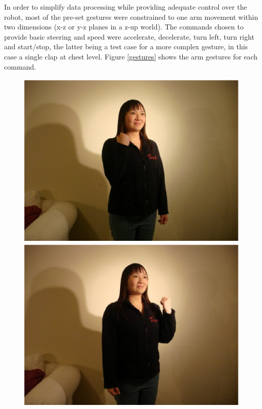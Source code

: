 \documentclass[12pt,a4,notitlepage]{report}
\renewcommand{\_}{\texttt{\symbol{95}}}
\newcommand{\<}{\texttt{\symbol{60}}}
\renewcommand{\>}{\texttt{\symbol{62}}}
\begin{document}
In order to simplify data processing while providing adequate control over the robot, most of the pre-set gestures were constrained to one arm movement within two dimensions (x-z or y-z planes in a z-up world). The commands chosen to provide basic steering and speed were accelerate, decelerate, turn left, turn right and start/stop, the latter being a test case for a more complex gesture, in this case a single clap at chest level. Figure \ref{gestures} shows the arm gestures for each command.

\begin{figure}
\centering
\includegraphics[scale=0.3,angle=0]{images/accel.ps}
\includegraphics[scale=0.3,angle=0]{images/decel.ps}

\end{figure}
\end{document}
